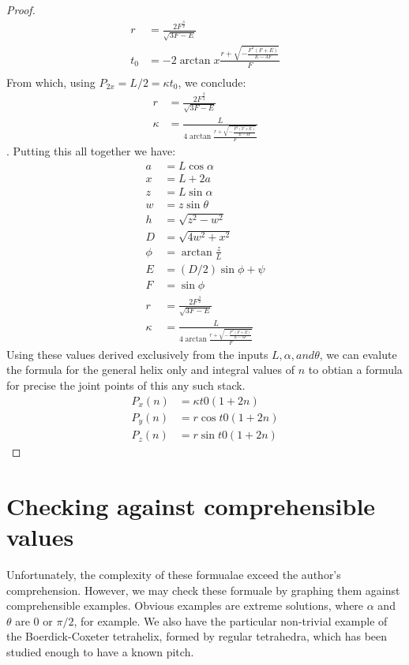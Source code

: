\documentclass[11pt]{article}
\begin{document}
\begin{proof}
  
  \begin{align*}  
    r &= \frac{2F^{\frac{3}{2}}}{\sqrt{3F - E}} \\
    t_0 &= -2 \arctan{x}
      \frac{r +
        \sqrt{- \frac{F^2(F+E)}{E-3F}
        }
      }
           {F}
     \\
  \end{align*}
  From which, using $P_{2x} = L/2 = \kappa t_0$, we conclude:
  \begin{align*}  
    r &= \frac{2F^{\frac{3}{2}}}{\sqrt{3F - E}} \\
    \kappa &= \frac{L}{4 \arctan{\frac{r + \sqrt{- \frac{F^2(F+E)}{E-3F}}}{F}}}
  \end{align*}.
  Putting this all together we have:
  \begin{align*}
    a &= L \cos{\alpha} \\
    x &= L + 2a \\
    z &= L \sin{\alpha} \\
    w &= z \sin{\theta} \\
    h &= \sqrt{z^2 - w^2} \\
    D &= \sqrt{4w^2+x^2} \\
    \phi &= \arctan{\frac{z}{L}} \\
    E &= (D/2) \sin{\phi + \psi} \\
    F &= \sin{\phi} \\
    r &= \frac{2F^{\frac{3}{2}}}{\sqrt{3F - E}} \\
    \kappa &= \frac{L}{4 \arctan{\frac{r + \sqrt{- \frac{F^2(F+E)}{E-3F}}}{F}}}
  \end{align*}
  Using these values derived exclusively from the inputs $L,\alpha, and \theta$, we can
  evalute the formula for the general helix only and integral values of $n$ to
  obtian a formula for precise the joint points of this any such stack.
\begin{align*}
    P_x(n) &= \kappa  t0 (1 + 2n)  \\
    P_y(n) &= r \cos{t0 (1 + 2n)} \\
    P_z(n) &= r \sin{t0 (1 + 2n)}
\end{align*}

\end{proof}

\section{Checking against comprehensible values}

Unfortunately, the complexity of these formualae exceed the author's comprehension.
However, we may check these formuale by graphing them against comprehensible
examples. Obvious examples are extreme solutions, where $\alpha$  and $\theta$ are
$0$ or $\pi/2$, for example. We also have the particular non-trivial example
of the Boerdick-Coxeter tetrahelix, formed by regular tetrahedra, which has
been studied enough to have a known pitch.
\end{document}
